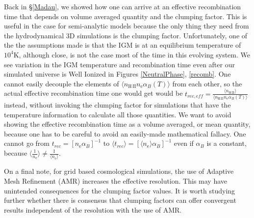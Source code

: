 Back in \S\ref{Madau}, we showed how one can arrive at an effective recombination time that depends on volume averaged quantity and the clumping factor.  This is useful in the case for semi-analytic models because the only thing they need from the hydrodynamical 3D simulations is the clumping factor.  Unfortunately, one of the the assumptions made is that the IGM is at an equilibrium temperature of $10^4$K, although close, is not the case most of the time in this evolving system.  We see variation in the IGM temperature and recombination time even after our simulated universe is Well Ionized in Figures \ref{NeutralPhase}, \ref{recomb}.  One cannot easily decouple the elements of $\langle n_\mathrm{H\,II} n_\mathrm{e} \alpha_B(T)\rangle$ from each other, so the actual effective recombination time one would get would be $t_{rec,eff}=\frac{\langle n_\mathrm{H\,II}\rangle}{\langle n_\mathrm{H\,II} n_\mathrm{e} \alpha_B(T)\rangle}$ instead, without invoking the clumping factor for simulations that have the temperature information to calculate all those quantities.  We want to avoid showing the effective recombination time as a volume averaged, or mean quantity, because one has to be careful to avoid an easily-made mathematical fallacy. One cannot go from $t_{rec}= [n_\mathrm{e}\alpha_B]^{-1}$ to $\langle t_{rec} \rangle=[\langle n_\mathrm{e} \rangle\alpha_B]^{-1}$ even if $\alpha_B$ is a constant, because $\langle\frac{1}{n_\mathrm{e}}\rangle \neq \frac{1}{\langle n_\mathrm{e}\rangle}$.

On a final note, for grid based cosmological simulations, the use of Adaptive Mesh Refinement (AMR) increases the effective resolution.  This may have unintended consequences for the clumping factor values.  It is worth studying further whether there is consensus that clumping factors can offer convergent results independent of the resolution with the use of AMR.



